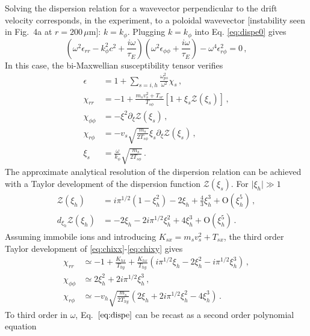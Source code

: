 \documentclass[aps,showpacs,superscriptaddress]{revtex4}
\begin{document}
Solving the dispersion relation for a wavevector perpendicular to the drift velocity corresponds, in the experiment, to a poloidal wavevector [instability seen in Fig.~4a at $r = 200\, \mu$m]: $k = k_\phi$. 
Plugging $k = k_\phi$ into Eq. \eqref{eq:dispe0} gives
\begin{equation}\label{eq:dispe}
\left(\omega^2 \epsilon_{rr} - k_\phi^2c^2 +\frac{i\omega}{\tau_E}\right)
\left(\omega^2 \epsilon_{\phi\phi} +\frac{i\omega}{\tau_E}\right)
-\omega^4 \epsilon_{r\phi}^2 = 0 \, ,
\end{equation}
In this case, the bi-Maxwellian susceptibility tensor verifies \cite[]{POP_Ruyer_2015}
\begin{align}
 \epsilon &=  1 + \sum_{s = i,h}\frac{\omega_{ps}^2}{\omega^2}  \chi_s\, , \label{eq:eps}\\
  \chi_{rr} &= -1  + \frac{m_sv_s^2 + T_{sr} }{T_{s\phi}} [1+\xi_s\mathcal{Z}(\xi_s) ]\, \label{eq:chixx},\\
  \chi_{\phi\phi} &=-\xi^2 \partial_\xi\mathcal{Z}(\xi_s) \, ,\\
  \chi_{r\phi} & =  -v_s\sqrt{\frac{m_s}{2T_{s\phi}}} \xi_s \partial_\xi \mathcal{Z}(\xi_s)  \label{eq:chixy}\, ,\\
  \xi_s  &= \frac{\omega }{k_\phi} \sqrt{\frac{m_s}{2T_{s\phi}}}\label{eq:xi} \, .
\end{align}
The approximate analytical resolution of the dispersion relation can be achieved with a Taylor development of the dispersion function $\mathcal{Z}(\xi_s)$. For $\vert \xi_h \vert\gg 1$
\begin{align}
\mathcal{Z}(\xi_h) & =  i\pi^{1/2}(1-\xi_h^2) -2\xi_h +\frac{4}{3}\xi_h^3 + \mathrm{O}(\xi_h^5) \label{eq:taylor1} \, ,\\
d_{\xi_h} \mathcal{Z}(\xi_h)  &= -2\xi_h -2i\pi^{1/2}\xi_h^2 +4\xi_h^3+ \mathrm{O}(\xi_h^5)\label{eq:taylor2} \, .
\end{align}
Assuming immobile ions and introducing  $K_{sx} = m_sv_s^2 + T_{sx}$, the third order Taylor development of \eqref{eq:chixx}-\eqref{eq:chixy} gives
\begin{align}
  \chi_{rr} &\simeq -1  + \frac{K_{hx} }{T_{hy}} + \frac{K_{hx} }{T_{hy}} ( i\pi^{1/2}\xi_h -2\xi_h^2 -i\pi^{1/2}\xi_h^3) \, ,\\
  \chi_{\phi\phi} &\simeq2\xi_h^2+ 2i\pi^{1/2}\xi_h^3 \, ,\\
  \chi_{r\phi} & \simeq  -v_h\sqrt{\frac{m_s}{2T_{hy}}} (2\xi_h + 2i\pi^{1/2}\xi_h^2 -4\xi_h^3) \, .
\end{align}
To third order in $\omega$, Eq.~$\eqref{eq:dispe}$ can be recast as a second order polynomial equation 
\end{document}
